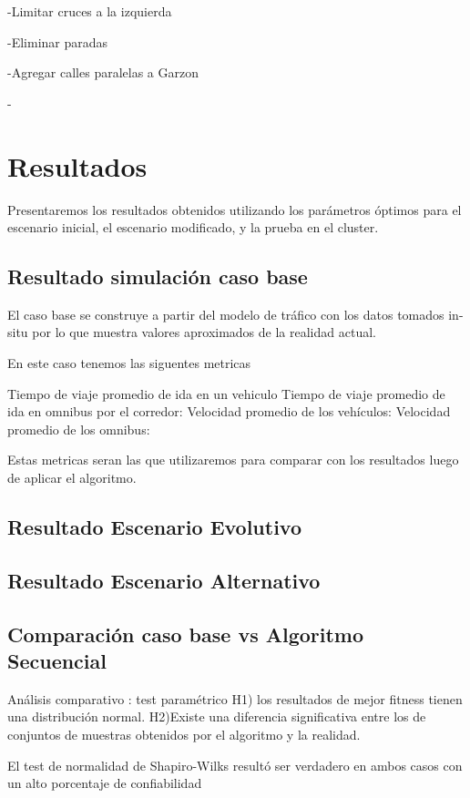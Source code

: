 -Limitar cruces a la izquierda

-Eliminar paradas

-Agregar calles paralelas a Garzon

-


\section{Resultados}
Presentaremos los resultados obtenidos  utilizando los parámetros óptimos  para el escenario inicial, el escenario modificado, y la prueba en el cluster.

\subsection{Resultado simulación caso base}
El caso base se construye a partir del modelo de tráfico con los datos tomados in-situ por lo que muestra valores aproximados de la realidad actual.

En este caso tenemos las siguentes metricas

Tiempo de viaje promedio de ida en un vehiculo
Tiempo de viaje promedio de ida en omnibus por el corredor:
Velocidad promedio de los vehículos:
Velocidad promedio de los omnibus:

Estas metricas seran las que utilizaremos para comparar con los resultados luego de aplicar el algoritmo.

\subsection{Resultado Escenario Evolutivo}
\subsection{Resultado Escenario Alternativo}

\subsection{Comparación caso base vs Algoritmo Secuencial}
Análisis comparativo : test paramétrico
H1)  los  resultados  de  mejor  fitness  tienen  una distribución normal.
H2)Existe  una  diferencia  significativa  entre  los  de conjuntos  de  muestras  obtenidos  por  el  algoritmo  y  la realidad.

El  test  de  normalidad  de  Shapiro-Wilks  resultó  ser verdadero  en  ambos  casos  con  un  alto  porcentaje  de
confiabilidad



